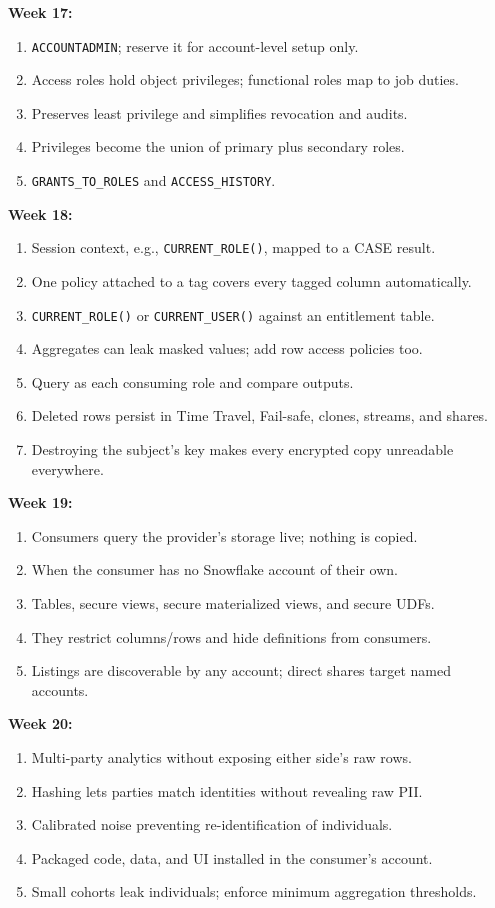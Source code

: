 \documentclass[11pt, a4paper]{article}
\begin{document}
\noindent\textbf{Week 17:}
\begin{enumerate}[nosep, leftmargin=6mm]
    \item \texttt{ACCOUNTADMIN}; reserve it for account-level setup only.
    \item Access roles hold object privileges; functional roles map to job duties.
    \item Preserves least privilege and simplifies revocation and audits.
    \item Privileges become the union of primary plus secondary roles.
    \item \texttt{GRANTS\_TO\_ROLES} and \texttt{ACCESS\_HISTORY}.
\end{enumerate}
\noindent\textbf{Week 18:}
\begin{enumerate}[nosep, leftmargin=6mm]
    \item Session context, e.g., \texttt{CURRENT\_ROLE()}, mapped to a CASE result.
    \item One policy attached to a tag covers every tagged column automatically.
    \item \texttt{CURRENT\_ROLE()} or \texttt{CURRENT\_USER()} against an entitlement table.
    \item Aggregates can leak masked values; add row access policies too.
    \item Query as each consuming role and compare outputs.
    \item Deleted rows persist in Time Travel, Fail-safe, clones, streams, and shares.
    \item Destroying the subject's key makes every encrypted copy unreadable everywhere.
\end{enumerate}
\noindent\textbf{Week 19:}
\begin{enumerate}[nosep, leftmargin=6mm]
    \item Consumers query the provider's storage live; nothing is copied.
    \item When the consumer has no Snowflake account of their own.
    \item Tables, secure views, secure materialized views, and secure UDFs.
    \item They restrict columns/rows and hide definitions from consumers.
    \item Listings are discoverable by any account; direct shares target named accounts.
\end{enumerate}
\noindent\textbf{Week 20:}
\begin{enumerate}[nosep, leftmargin=6mm]
    \item Multi-party analytics without exposing either side's raw rows.
    \item Hashing lets parties match identities without revealing raw PII.
    \item Calibrated noise preventing re-identification of individuals.
    \item Packaged code, data, and UI installed in the consumer's account.
    \item Small cohorts leak individuals; enforce minimum aggregation thresholds.
\end{enumerate}
\end{document}
